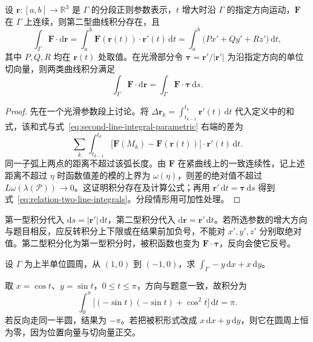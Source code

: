 \begin{theorem}
\label{thm:second-line-integral-parametric}
设 $\boldsymbol r:[a,b]\to\mathbb R^3$ 是 $\Gamma$ 的分段正则参数表示，$t$ 增大时沿 $\Gamma$ 的指定方向运动，$\boldsymbol F$ 在 $\Gamma$ 上连续，则第二型曲线积分存在，且
\begin{equation}
\label{eq:second-line-integral-parametric}
    \int_\Gamma\boldsymbol F\cdot\mathrm d\boldsymbol r
    =\int_a^b\boldsymbol F(\boldsymbol r(t))\cdot\boldsymbol r'(t)\,\mathrm dt
    =\int_a^b\bigl(Px'+Qy'+Rz'\bigr)\,\mathrm dt,
\end{equation}
其中 $P,Q,R$ 均在 $\boldsymbol r(t)$ 处取值。在光滑部分令 $\boldsymbol\tau=\boldsymbol r'/|\boldsymbol r'|$ 为沿指定方向的单位切向量，则两类曲线积分满足
\begin{equation}
\label{eq:relation-two-line-integrals}
    \int_\Gamma\boldsymbol F\cdot\mathrm d\boldsymbol r
    =\int_\Gamma\boldsymbol F\cdot\boldsymbol\tau\,\mathrm ds.
\end{equation}
\end{theorem}

\begin{proof}
先在一个光滑参数段上讨论。将 $\Delta\boldsymbol r_k=\int_{t_{k-1}}^{t_k}\boldsymbol r'(t)\,\mathrm dt$ 代入定义中的和式，该和式与式~\eqref{eq:second-line-integral-parametric} 右端的差为
\[
    \sum_k\int_{t_{k-1}}^{t_k}
    \bigl[\boldsymbol F(M_k)-\boldsymbol F(\boldsymbol r(t))\bigr]
    \cdot\boldsymbol r'(t)\,\mathrm dt.
\]
同一子弧上两点的距离不超过该弧长度。由 $\boldsymbol F$ 在紧曲线上的一致连续性，记上述距离不超过 $\eta$ 时函数值差的模的上界为 $\omega(\eta)$，则差的绝对值不超过 $L\omega(\lambda(\mathcal P))\to0$。这证明积分存在及计算公式；再用 $\boldsymbol r'\,\mathrm dt=\boldsymbol\tau\,\mathrm ds$ 得到式~\eqref{eq:relation-two-line-integrals}。分段情形用可加性处理。
\end{proof}

\begin{notealert}[type=caution,title={长度微元与有向位移}]
第一型积分代入 $\mathrm ds=|\boldsymbol r'|\,\mathrm dt$，第二型积分代入 $\mathrm d\boldsymbol r=\boldsymbol r'\,\mathrm dt$。若所选参数的增大方向与题目相反，应反转积分上下限或在结果前加负号，不能对 $x',y',z'$ 分别取绝对值。第二型积分化为第一型积分时，被积函数也变为 $\boldsymbol F\cdot\boldsymbol\tau$，反向会使它反号。
\end{notealert}

\begin{example}
\label{ex:second-line-integral-semicircle}
设 $\Gamma$ 为上半单位圆周，从 $(1,0)$ 到 $(-1,0)$，求 $\int_\Gamma-y\,\mathrm dx+x\,\mathrm dy$。
\end{example}
\begin{solve}
取 $x=\cos t$、$y=\sin t$，$0\leq t\leq\pi$，方向与题意一致，故积分为
\[
    \int_0^\pi\bigl[(-\sin t)(-\sin t)+\cos^2t\bigr]\,\mathrm dt=\pi.
\]
若反向走同一半圆，结果为 $-\pi$。若把被积形式改成 $x\,\mathrm dx+y\,\mathrm dy$，则它在圆周上恒为零，因为位置向量与切向量正交。
\end{solve}


